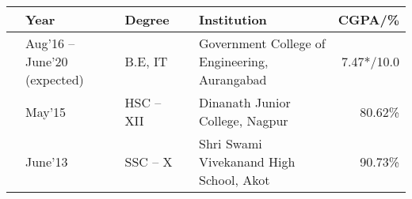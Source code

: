 \vspace{1mm}
\newcommand{\education}[4]{
  & #1 & #2 & & #3 & #4
}
\begin{center}
\begin{tabular}{ | L{0.05cm} l | L{3cm} | L{0.05cm} C{7cm} | r |}
  \hline
  \education{\textbf{Year}}{\textbf{Degree}}{\textbf{Institution}}{\textbf{CGPA/\%}}\\
  \hline
  \education{Aug'16 -- June'20 (expected)}{B.E, IT}{Government College of Engineering, Aurangabad}{7.47*/10.0}\\
  \education{May'15}{HSC -- XII}{Dinanath Junior College, Nagpur}{80.62\%}\\
  \education{June'13}{SSC -- X}{Shri Swami Vivekanand High School, Akot }{90.73\%}\\
  \hline
\end{tabular}
\end{center}


